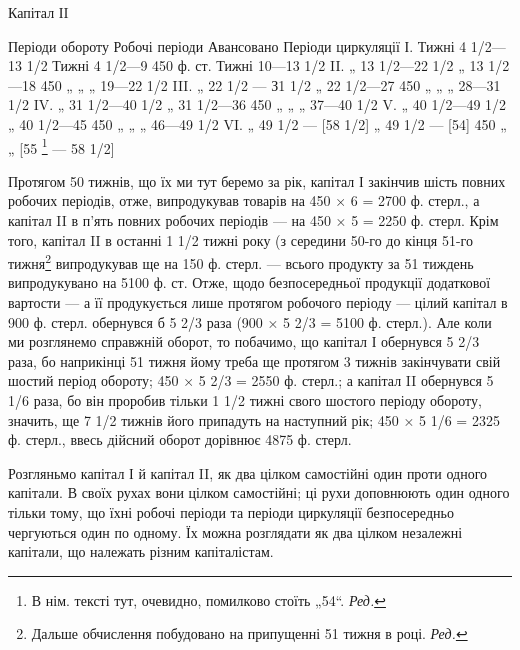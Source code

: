 Капітал ІI

Періоди обороту    Робочі періоди    Авансовано    Періоди циркуляції
І. Тижні 4 1/2—13 1/2  Тижні 4 1/2—9    450 ф. ст. Тижні 10—13 1/2
II. „ 13 1/2—22 1/2 „ 13 1/2—18    450 „ „ „ 19—22 1/2
III. „ 22 1/2 — З1 1/2 „ 22 1/2—27    450 „ „ „ 28—31 1/2
IV. „ 31 1/2—40 1/2 „ 31  1/2—36    450 „ „ „ 37—40 1/2
V. „ 40 1/2—49 1/2 „ 40 1/2—45    450 „ „ „ 46—49 1/2
VI. „ 49 1/2 — [58 1/2]  „ 49 1/2 — [54] 450 „ „ [55 \footnote*{
В нім. тексті тут, очевидно, помилково стоїть „54“. \emph{Ред.}
} — 58 1/2]

Протягом 50 тижнів, що їх ми тут беремо за рік, капітал І закінчив
шість повних робочих періодів, отже, випродукував товарів на 450 × 6
= 2700 ф. стерл., а капітал II в п’ять повних робочих періодів — на
450 × 5 = 2250 ф. стерл. Крім того, капітал II в останні 1 1/2 тижні року
(з середини 50-го до кінця 51-го тижня\footnote*{
Дальше обчислення побудовано на припущенні 51 тижня в році. \emph{Ред.}
} випродукував ще на 150 ф.
стерл. — всього продукту за 51 тиждень випродукувано на 5100 ф. ст.
Отже, щодо безпосередньої продукції додаткової вартости — а її продукується
лише протягом робочого періоду — цілий капітал в 900 ф. стерл. обернувся
б 5 2/3 раза (900 × 5 2/3 = 5100 ф. стерл.). Але коли ми розглянемо
справжній оборот, то побачимо, що капітал І обернувся 5 2/3 раза, бо
наприкінці 51 тижня йому треба ще протягом 3 тижнів закінчувати
свій шостий період обороту; 450 × 5 2/3 = 2550 ф. стерл.; а капітал
II обернувся 5 1/6 раза, бо він проробив тільки 1 1/2 тижні свого
шостого періоду обороту, значить, ще 7 1/2 тижнів його припадуть на
наступний рік; 450 × 5 1/6 = 2325 ф. стерл., ввесь дійсний оборот дорівнює
4875 ф. стерл.

Розгляньмо капітал І й капітал II, як два цілком самостійні один проти
одного капітали. В своїх рухах вони цілком самостійні; ці рухи доповнюють
один одного тільки тому, що їхні робочі періоди та періоди
циркуляції безпосередньо чергуються один по одному. Їх можна розглядати
як два цілком незалежні капітали, що належать різним капіталістам.

